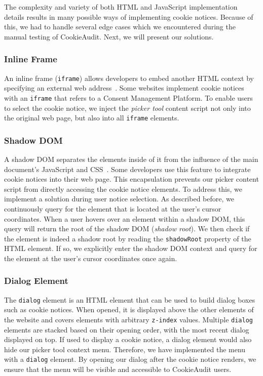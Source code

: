 The complexity and variety of both HTML and JavaScript implementation details results in many possible ways of implementing cookie notices.
Because of this, we had to handle several edge cases which we encountered during the manual testing of CookieAudit.
Next, we will present our solutions.

\subsubsection{Inline Frame}
An inline frame (\texttt{iframe}) allows developers to embed another HTML context by specifying an external web address~\cite{iframeMdn}.
Some websites implement cookie notices with an \texttt{iframe} that refers to a Consent Management Platform.
To enable users to select the cookie notice, we inject the \emph{picker tool} content script not only into the original web page, but also into all \texttt{iframe} elements.

\subsubsection{Shadow DOM}
A shadow DOM separates the elements inside of it from the influence of the main document's JavaScript and CSS~\cite{shadowDomMdn}.
Some developers use this feature to integrate cookie notices into their web page.
This encapsulation prevents our picker content script from directly accessing the cookie notice elements. 
To address this, we implement a solution during user notice selection.
As described before, we continuously query for the element that is located at the user's cursor coordinates.
When a user hovers over an element within a shadow DOM, this query will return the root of the shadow DOM (\emph{shadow root}). 
We then check if the element is indeed a shadow root by reading the \texttt{shadowRoot} property of the HTML element.
If so, we explicitly enter the shadow DOM context and query for the element at the user's cursor coordinates once again. 

\subsubsection{Dialog Element}
The \texttt{dialog} element is an HTML element that can be used to build dialog boxes such as cookie notices.
When opened, it is displayed above the other elements of the website and covers elements with arbitrary \texttt{z-index} values. 
Multiple \texttt{dialog} elements are stacked based on their opening order, with the most recent dialog displayed on top.
If used to display a cookie notice, a dialog element would also hide our picker tool context menu.
Therefore, we have implemented the menu with a \texttt{dialog} element.
By opening our dialog after the cookie notice renders, we ensure that the menu will be visible and accessible to CookieAudit users.

